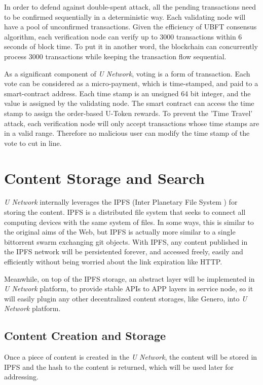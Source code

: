 In order to defend against double-spent attack, all the pending transactions need to be confirmed sequentially in a deterministic way. Each validating node will have a pool of unconfirmed transactions. Given the efficiency of UBFT consensus algorithm, each verification node can verify up to 3000 transactions within 6 seconds of block time. To put it in another word, the blockchain can concurrently process 3000 transactions while keeping the transaction flow sequential. 


As a significant component of \emph{U Network}, voting is a form of transaction. Each vote can be considered as a micro-payment, which is time-stamped, and paid to a smart-contract address. Each time stamp is an unsigned 64 bit integer, and the value is assigned by the validating node. The smart contract can access the time stamp to assign the order-based U-Token rewards. To prevent the 'Time Travel' attack, each verification node will only accept transactions whose time stamps are in a valid range. Therefore no malicious user can modify the time stamp of the vote to cut in line.  

\section{Content Storage and Search}
\emph{U Network} internally leverages the IPFS (Inter Planetary File System \cite{ipfs}) for storing the content. IPFS is a distributed file system that seeks to connect all computing devices with the same system of files. In some ways, this is similar to the original aims of the Web, but IPFS is actually more similar to a single bittorrent swarm exchanging git objects. With IPFS, any content published in the IPFS network will be persistented forever, and accessed freely, easily and efficiently without being worried about the link expiration like HTTP. 

Meanwhile, on top of the IPFS storage, an abstract layer will be implemented in \emph{U Network} platform, to provide stable APIs to APP layers in service node, so it will easily plugin any other decentralized content storages, like Genero, into \emph{U Network} platform.

\subsection{Content Creation and Storage}
Once a piece of content is created in the \emph{U Network}, the content will be stored in IPFS and the hash to the content is returned, which will be used later for addressing. 

